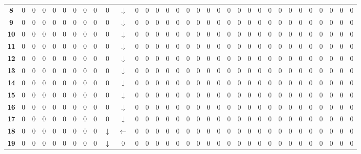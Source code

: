 \documentclass[Main]{subfiles}
\begin{document}
\begin{table}[H]
{\begin{tabular}{ccccccccccccccccccccccccccccccccc}
			\textbf{ 8} &  0 &  0 &  0 &  0 &  0 &  0 &  0 &  0 &  0 &  $\downarrow$ &  0 &  0 &  0 &  0 &  0 &  0 &  0 &  0 &  0 &  0 &  0 &  0 &  0 &  0 &  0 &  0 &  0 &  0 &  0 &  0 &  0 &  0 \\
			\textbf{ 9} &  0 &  0 &  0 &  0 &  0 &  0 &  0 &  0 &  0 &  $\downarrow$ &  0 &  0 &  0 &  0 &  0 &  0 &  0 &  0 &  0 &  0 &  0 &  0 &  0 &  0 &  0 &  0 &  0 &  0 &  0 &  0 &  0 &  0 \\
			\textbf{10} &  0 &  0 &  0 &  0 &  0 &  0 &  0 &  0 &  0 &  $\downarrow$ &  0 &  0 &  0 &  0 &  0 &  0 &  0 &  0 &  0 &  0 &  0 &  0 &  0 &  0 &  0 &  0 &  0 &  0 &  0 &  0 &  0 &  0 \\
			\textbf{11} &  0 &  0 &  0 &  0 &  0 &  0 &  0 &  0 &  0 &  $\downarrow$ &  0 &  0 &  0 &  0 &  0 &  0 &  0 &  0 &  0 &  0 &  0 &  0 &  0 &  0 &  0 &  0 &  0 &  0 &  0 &  0 &  0 &  0 \\
			\textbf{12} &  0 &  0 &  0 &  0 &  0 &  0 &  0 &  0 &  0 &  $\downarrow$ &  0 &  0 &  0 &  0 &  0 &  0 &  0 &  0 &  0 &  0 &  0 &  0 &  0 &  0 &  0 &  0 &  0 &  0 &  0 &  0 &  0 &  0 \\
			\textbf{13} &  0 &  0 &  0 &  0 &  0 &  0 &  0 &  0 &  0 &  $\downarrow$ &  0 &  0 &  0 &  0 &  0 &  0 &  0 &  0 &  0 &  0 &  0 &  0 &  0 &  0 &  0 &  0 &  0 &  0 &  0 &  0 &  0 &  0 \\
			\textbf{14} &  0 &  0 &  0 &  0 &  0 &  0 &  0 &  0 &  0 &  $\downarrow$ &  0 &  0 &  0 &  0 &  0 &  0 &  0 &  0 &  0 &  0 &  0 &  0 &  0 &  0 &  0 &  0 &  0 &  0 &  0 &  0 &  0 &  0 \\
			\textbf{15} &  0 &  0 &  0 &  0 &  0 &  0 &  0 &  0 &  0 &  $\downarrow$ &  0 &  0 &  0 &  0 &  0 &  0 &  0 &  0 &  0 &  0 &  0 &  0 &  0 &  0 &  0 &  0 &  0 &  0 &  0 &  0 &  0 &  0 \\
			\textbf{16} &  0 &  0 &  0 &  0 &  0 &  0 &  0 &  0 &  0 &  $\downarrow$ &  0 &  0 &  0 &  0 &  0 &  0 &  0 &  0 &  0 &  0 &  0 &  0 &  0 &  0 &  0 &  0 &  0 &  0 &  0 &  0 &  0 &  0 \\
			\textbf{17} &  0 &  0 &  0 &  0 &  0 &  0 &  0 &  0 &  0 &  $\downarrow$ &  0 &  0 &  0 &  0 &  0 &  0 &  0 &  0 &  0 &  0 &  0 &  0 &  0 &  0 &  0 &  0 &  0 &  0 &  0 &  0 &  0 &  0 \\
			\textbf{18} &  0 &  0 &  0 &  0 &  0 &  0 &  0 &  0 &  $\downarrow$ &  $\leftarrow$ &  0 &  0 &  0 &  0 &  0 &  0 &  0 &  0 &  0 &  0 &  0 &  0 &  0 &  0 &  0 &  0 &  0 &  0 &  0 &  0 &  0 &  0 \\
			\textbf{19} &  0 &  0 &  0 &  0 &  0 &  0 &  0 &  0 &  $\downarrow$ &  0 &  0 &  0 &  0 &  0 &  0 &  0 &  0 &  0 &  0 &  0 &  0 &  0 &  0 &  0 &  0 &  0 &  0 &  0 &  0 &  0 &  0 &  0 \\

\end{tabular}}
\end{table}
\end{document}
